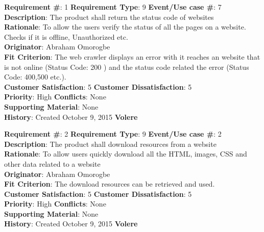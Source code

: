 \documentclass[titlepage]{article}
\begin{document}
\begin{framed}

\textbf{Requirement \#}: 1 \hfill \textbf{Requirement Type}: 9 \hfill\textbf{Event/Use case \#}: 7 \hfill\\
\textbf{Description}:  The product shall return the status code of websites\\
\textbf{Rationale}: To allow the users verify the status of all the pages on a website. Checks if it is offline, Unauthorized etc.\\
\textbf{Originator}: Abraham Omorogbe\\
\textbf{Fit Criterion}: The web crawler displays an error with it reaches an website that is not online (Status Code: 200 ) and the status code related the error (Status Code: 400,500 etc.).	\\
\textbf{Customer Satisfaction}: 5 \hfill 	\textbf{Customer Dissatisfaction}: 5 \hfill\\
\textbf{Priority}: High \hfill \textbf{Conflicts}: None \hfill 		\\
\textbf{Supporting Material}: None\\
\textbf{History}: Created October 9, 2015 \hfill	 \textbf{Volere}\hfill

\end{framed}

\begin{framed}
\textbf{Requirement \#}: 2 \hfill \textbf{Requirement Type}: 9 \hfill\textbf{Event/Use case \#}: 2 \hfill\\
\textbf{Description}:  The product shall download resources from a website\\
\textbf{Rationale}: To allow users quickly download all the HTML, images, CSS and other data related to a website\\
\textbf{Originator}: Abraham Omorogbe\\
\textbf{Fit Criterion}:  The download resources can be retrieved and used.\\
\textbf{Customer Satisfaction}: 5 \hfill 	\textbf{Customer Dissatisfaction}: 5 \hfill\\
\textbf{Priority}: High \hfill \textbf{Conflicts}: None \hfill 		\\
\textbf{Supporting Material}: None\\
\textbf{History}: Created October 9, 2015 \hfill	 \textbf{Volere}\hfill

\end{framed}
\end{document}
